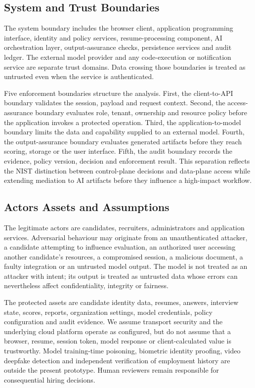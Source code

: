 \documentclass[conference]{IEEEtran}
\begin{document}
\subsection{System and Trust Boundaries}

The system boundary includes the browser client, application programming interface, identity and policy services, resume-processing component, AI orchestration layer, output-assurance checks, persistence services and audit ledger. The external model provider and any code-execution or notification service are separate trust domains. Data crossing those boundaries is treated as untrusted even when the service is authenticated.

Five enforcement boundaries structure the analysis. First, the client-to-API boundary validates the session, payload and request context. Second, the access-assurance boundary evaluates role, tenant, ownership and resource policy before the application invokes a protected operation. Third, the application-to-model boundary limits the data and capability supplied to an external model. Fourth, the output-assurance boundary evaluates generated artifacts before they reach scoring, storage or the user interface. Fifth, the audit boundary records the evidence, policy version, decision and enforcement result. This separation reflects the NIST distinction between control-plane decisions and data-plane access while extending mediation to AI artifacts before they influence a high-impact workflow.

\subsection{Actors Assets and Assumptions}

The legitimate actors are candidates, recruiters, administrators and application services. Adversarial behaviour may originate from an unauthenticated attacker, a candidate attempting to influence evaluation, an authorized user accessing another candidate's resources, a compromised session, a malicious document, a faulty integration or an untrusted model output. The model is not treated as an attacker with intent; its output is treated as untrusted data whose errors can nevertheless affect confidentiality, integrity or fairness.

The protected assets are candidate identity data, resumes, answers, interview state, scores, reports, organization settings, model credentials, policy configuration and audit evidence. We assume transport security and the underlying cloud platform operate as configured, but do not assume that a browser, resume, session token, model response or client-calculated value is trustworthy. Model training-time poisoning, biometric identity proofing, video deepfake detection and independent verification of employment history are outside the present prototype. Human reviewers remain responsible for consequential hiring decisions.
\end{document}

